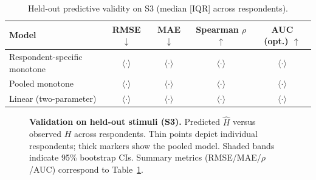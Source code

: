 \documentclass[final,3p,times,review]{elsarticle}
\begin{document}
\begin{table}[H]
\centering
\caption{Held-out predictive validity on S3 (median [IQR] across respondents).}
\label{tab:heldout}
\begin{tabular}{@{}lcccc@{}}
\toprule
Model & RMSE $\downarrow$ & MAE $\downarrow$ & Spearman $\rho$ $\uparrow$ & AUC (opt.) $\uparrow$ \\
\midrule
Respondent-specific monotone & $\langle \cdot \rangle$ & $\langle \cdot \rangle$ & $\langle \cdot \rangle$ & $\langle \cdot \rangle$ \\
Pooled monotone & $\langle \cdot \rangle$ & $\langle \cdot \rangle$ & $\langle \cdot \rangle$ & $\langle \cdot \rangle$ \\
Linear (two-parameter) & $\langle \cdot \rangle$ & $\langle \cdot \rangle$ & $\langle \cdot \rangle$ & $\langle \cdot \rangle$ \\
\bottomrule
\end{tabular}
\end{table}

\begin{figure}[t]
  \centering
  \caption{\textbf{Validation on held-out stimuli (S3).} Predicted $\widehat{H}$ versus observed $H$ across respondents. Thin points depict individual respondents; thick markers show the pooled model. Shaded bands indicate 95\% bootstrap CIs. Summary metrics (RMSE/MAE/$\rho$/AUC) correspond to Table~\ref{tab:heldout}.}
  \label{fig:validation}
\end{figure}
\end{document}
